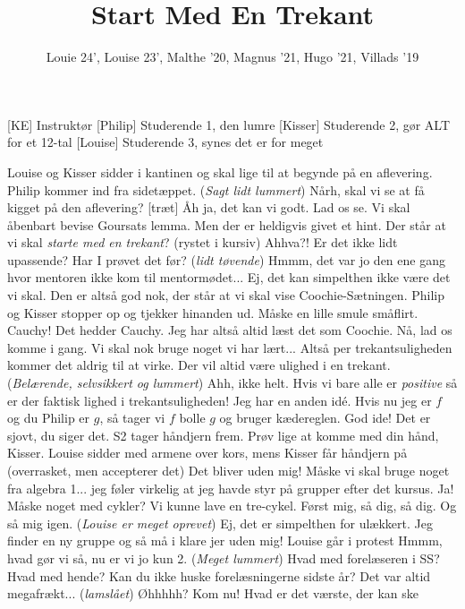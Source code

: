 \documentclass[a4paper,11pt]{article}
\title{Start Med En Trekant}
\author{Louie 24', Louise 23', Malthe '20, Magnus '21, Hugo '21, Villads '19}
\begin{document}
\maketitle

\begin{roles}
[KE] Instruktør
[Philip] Studerende 1, den lumre
[Kisser] Studerende 2, gør ALT for et 12-tal
[Louise] Studerende 3, synes det er for meget
\end{roles}

\begin{sketch}
\scene Louise og Kisser sidder i kantinen og skal lige til at begynde på en aflevering. Philip kommer ind fra sidetæppet.
 (\textit{Sagt lidt lummert}) Nårh, skal vi se at få kigget på den aflevering?
[træt] Åh ja, det kan vi godt.
 Lad os se. Vi skal åbenbart bevise Goursats lemma. Men der er heldigvis givet et hint.  Der står at vi skal \textit{starte med en trekant}? (rystet i kursiv)
 Ahhva?! Er det ikke lidt upassende? Har I prøvet det før?
 (\textit{lidt tøvende}) Hmmm, det var jo den ene gang hvor mentoren ikke kom til mentormødet...
 Ej, det kan simpelthen ikke være det vi skal. 
 Den er altså god nok, der står at vi skal vise Coochie-Sætningen.
\scene Philip og Kisser stopper op og tjekker hinanden ud. Måske en lille smule småflirt.
 Cauchy! Det hedder Cauchy.
 Jeg har altså altid læst det som Coochie.
 Nå, lad os komme i gang. Vi skal nok bruge noget vi har lært...
 Altså per trekantsuligheden kommer det aldrig til at virke. Der vil altid være ulighed i en trekant.
 (\textit{Belærende, selvsikkert og lummert}) Ahh, ikke helt. Hvis vi bare alle er \textit{positive} så er der faktisk lighed i trekantsuligheden!
 Jeg har en anden idé. Hvis nu jeg er $f$ og du Philip er $g$, så tager vi $f$ bolle $g$ og bruger kædereglen. 
 God ide! Det er sjovt, du siger det.
\scene S2 tager håndjern frem.
 Prøv lige at komme med din hånd, Kisser.
\scene Louise sidder med armene over kors, mens Kisser får håndjern på (overrasket, men accepterer det)
 Det bliver uden mig!
 Måske vi skal bruge noget fra algebra 1... jeg føler virkelig at jeg havde styr på grupper efter det kursus.
 Ja! Måske noget med cykler? Vi kunne lave en tre-cykel. Først mig, så dig, så dig. Og så mig igen.
 (\textit{Louise er meget oprevet}) Ej, det er simpelthen for ulækkert. Jeg finder en ny gruppe og så må i klare jer uden mig!
\scene Louise går i protest
 Hmmm, hvad gør vi så, nu er vi jo kun 2.
 (\textit{Meget lummert}) Hvad med forelæseren i SS?
 Hvad med hende?
 Kan du ikke huske forelæsningerne sidste år? Det var altid megafrækt...
 (\textit{lamslået}) Øhhhhh? 
 Kom nu! Hvad er det værste, der kan ske
\end{sketch}
\end{document}
